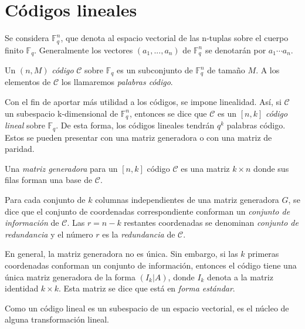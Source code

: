 \section{Códigos lineales}

Se considera $\mathbb{F}_q^n$, que denota al espacio vectorial de las n-tuplas sobre el 
cuerpo finito $\mathbb{F}_q$. Generalmente los vectores $(a_1, ..., a_n)$ de $\mathbb{F}_q^n$ se denotarán por $a_1 \cdots a_n$.

\begin{definition}
    Un $(n, M)$ \emph{código} $\mathcal{C}$ sobre $\mathbb{F}_q$ es un subconjunto de 
    $\mathbb{F}_q^n$ de tamaño $M$. A los elementos de $\mathcal{C}$ los llamaremos \emph{palabras código}.
\end{definition}

Con el fin de aportar más utilidad a los códigos, se impone linealidad. Así, si $\mathcal{C}$ un subespacio k-dimensional de $\mathbb{F}_q^n$, entonces se dice que $\mathcal{C}$ es un $\left[ n, k \right]$ \emph{código lineal} sobre $\mathbb{F}_q$. De esta forma, los códigos lineales tendrán $q^k$ palabras código. Estos se pueden presentar con una matriz generadora o con una matriz de paridad.

\begin{definition}
    Una \emph{matriz generadora} para un $\left[ n,k \right]$ código $\mathcal{C}$ es una matriz $k \times n$ donde sus filas forman una base de $\mathcal{C}$.
\end{definition}

\begin{definition}
    Para cada conjunto de $k$ columnas independientes de una matriz generadora $G$, se dice que el conjunto de coordenadas correspondiente conforman un \emph{conjunto de información} de $\mathcal{C}$. Las $r = n-k$ restantes coordenadas se denominan \emph{conjunto de redundancia} y el número $r$ es la \emph{redundancia} de $\mathcal{C}$.
\end{definition}

En general, la matriz generadora no es única. Sin embargo, si las $k$ primeras coordenadas conforman un conjunto de información, entonces el código tiene una única matriz generadora de la forma $( I_k | A)$, donde $I_k$ denota a la matriz identidad $k \times k$. Esta matriz se dice que está en \emph{forma estándar}.

Como un código lineal es un subespacio de un espacio vectorial, es el núcleo de alguna transformación lineal.

